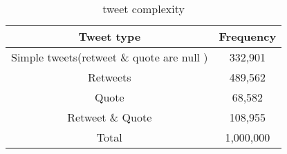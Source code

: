 
\begin{table}
	\centering
	\caption{tweet complexity }
	\label{tbl:object_size}
	\begin{adjustbox}{width=\columnwidth,center}	
		
		\begin{tabular}{|c|c|} \hline
			Tweet type & Frequency\\ \hline
			Simple tweets(retweet \& quote are null ) & 332,901\\ \hline
			Retweets & 489,562\\ \hline
			Quote & 68,582\\ \hline
			Retweet \& Quote & 108,955\\ \hline
			Total & 1,000,000 \\ \hline
			
			\hline\end{tabular}
	\end{adjustbox}
\end{table}



